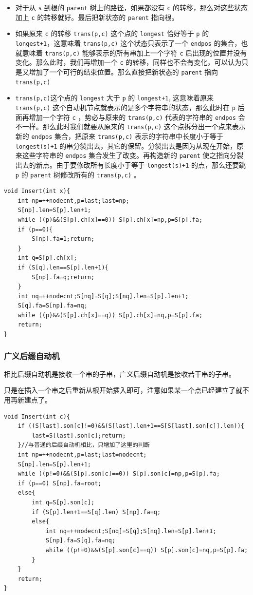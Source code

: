 \documentclass[UTF-8]{ctexart}
\begin{document}
	\begin{itemize}
		\item 对于从 \texttt{s} 到根的 \texttt{parent} 树上的路径，如果都没有 \texttt{c} 的转移，那么对这些状态加上 \texttt{c} 的转移就好。最后把新状态的 \texttt{parent} 指向根。
		\item 如果原来 \texttt{c} 的转移 \texttt{trans(p,c)} 这个点的 \texttt{longest} 恰好等于 \texttt{p} 的 \texttt{longest+1}，这意味着 \texttt{trans(p,c)} 这个状态只表示了一个 \texttt{endpos} 的集合，也就意味着 \texttt{trans(p,c)} 能够表示的所有串加上一个字符 \texttt{c} 后出现的位置并没有变化。那么此时，我们再增加一个 \texttt{c} 的转移，同样也不会有变化，可以认为只是又增加了一个可行的结束位置。那么直接把新状态的 \texttt{parent} 指向 \texttt{trans(p,c)}
		\item \texttt{trans(p,c)}这个点的 \texttt{longest} 大于 \texttt{p} 的 \texttt{longest+1}, 这意味着原来 \texttt{trans(p,c)} 这个自动机节点就表示的是多个字符串的状态，那么此时在 \texttt{p} 后面再增加一个字符 \texttt{c} ，势必与原来的 \texttt{trans(p,c)} 代表的字符串的 \texttt{endpos} 会不一样。那么此时我们就要从原来的 \texttt{trans(p,c)} 这个点拆分出一个点来表示新的 \texttt{endpos} 集合，把原来 \texttt{trans(p,c)} 表示的字符串中长度小于等于 \texttt{longest(s)+1} 的串分裂出去，其它的保留。分裂出去是因为从现在开始，原来这些字符串的 \texttt{endpos} 集合发生了改变。再构造新的 \texttt{parent} 使之指向分裂出去的新点。由于要修改所有长度小于等于 \texttt{longest(s)+1} 的点，那么还要跳 \texttt{p} 的 \texttt{parent} 树修改所有的 \texttt{trans(p,c)} 。
	\end{itemize}
\begin{verbatim}
void Insert(int x){
    int np=++nodecnt,p=last;last=np;
    S[np].len=S[p].len+1;
    while ((p)&&(S[p].ch[x]==0)) S[p].ch[x]=np,p=S[p].fa;
    if (p==0){
        S[np].fa=1;return;
    }
    int q=S[p].ch[x];
    if (S[q].len==S[p].len+1){
        S[np].fa=q;return;
    }
    int nq=++nodecnt;S[nq]=S[q];S[nq].len=S[p].len+1;
    S[q].fa=S[np].fa=nq;
    while ((p)&&(S[p].ch[x]==q)) S[p].ch[x]=nq,p=S[p].fa;
    return;
}
\end{verbatim}
	\subsubsection{广义后缀自动机}
	相比后缀自动机是接收一个串的子串，广义后缀自动机是接收若干串的子串。
	
	只是在插入一个串之后重新从根开始插入即可，注意如果某一个点已经建立了就不用再新建点了。
\begin{verbatim}
void Insert(int c){
    if ((S[last].son[c]!=0)&&(S[last].len+1==S[S[last].son[c]].len)){
        last=S[last].son[c];return;
    }//与普通的后缀自动机相比，只增加了这里的判断
    int np=++nodecnt,p=last;last=nodecnt;
    S[np].len=S[p].len+1;
    while ((p!=0)&&(S[p].son[c]==0)) S[p].son[c]=np,p=S[p].fa;
    if (p==0) S[np].fa=root;
    else{
        int q=S[p].son[c];
        if (S[p].len+1==S[q].len) S[np].fa=q;
        else{
            int nq=++nodecnt;S[nq]=S[q];S[nq].len=S[p].len+1;
            S[np].fa=S[q].fa=nq;
            while ((p!=0)&&(S[p].son[c]==q)) S[p].son[c]=nq,p=S[p].fa;
        }
    }
    return;
}
\end{verbatim}
\end{document}

